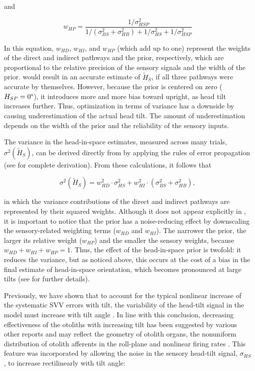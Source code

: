 and

\begin{equation}
\label{p1:eqn9}
w_{HP} = \frac{1 / \sigma^2_{HSP}}{1 / (\sigma^2_{BS} + \sigma^2_{HB}) + 1/\sigma^2_{HS} + 1/\sigma^2_{HSP}}
\end{equation}

In this equation, $w_{HD}$, $w_{HI}$, and $w_{HP}$ (which add up to one) represent the weights of the direct and indirect pathways and the prior, respectively, which are proportional to the relative precision of the sensory signals and the width of the prior.  would result in an accurate estimate of $\tilde{H}_S$, if all three pathways were accurate by themselves. However, because the prior is centered on zero ($H_{SP} = 0\degree$), it introduces more and more bias toward upright, as head tilt increases further. Thus, optimization in terms of variance has a downside by causing underestimation of the actual head tilt. The amount of underestimation depends on the width of the prior and the reliability of the sensory inputs.

The variance in the head-in-space estimates, measured across many trials, $\sigma^2(\tilde{H}_S)$, can be derived directly from  by applying the rules of error propagation (see  for complete derivation). From these calculations, it follows that 

\begin{equation}
\label{p1:eqn10}
\sigma^2(\tilde{H}_{S}) = w^2_{HD} \cdot \sigma^2_{HS} + w^2_{HI} \cdot (\sigma^2_{BS} + \sigma^2_{HB}),
\end{equation}

in which the variance contributions of the direct and indirect pathways are represented by their squared weights. Although it does not appear explicitly in , it is important to notice that the prior has a noise-reducing effect by downscaling the sensory-related weighting terms ($w_{HD}$ and $w_{HI}$). The narrower the prior, the larger its relative weight ($w_{HP}$) and the smaller the sensory weights, because $w_{HD} + w_{HI} + w_{HP} = 1$. Thus, the effect of the head-in-space prior is twofold: it reduces the variance, but as noticed above, this occurs at the cost of a bias in the final estimate of head-in-space orientation, which becomes pronounced at large tilts (see  for further details). 

Previously, we have shown that to account for the typical nonlinear increase of the systematic SVV errors with tilt, the variability of the head-tilt signal in the model must increase with tilt angle \cite{devrijer2008,devrijer2009}. In line with this conclusion, decreasing effectiveness of the otoliths with increasing tilt has been suggested by various other reports \cite{schone1968,tarnutzer2009,tarnutzer2010} and may reflect the geometry of otolith organs, the nonuniform distribution of otolith afferents in the roll-plane and nonlinear firing rates \cite{tarnutzer2010}. This feature was incorporated by allowing the noise in the sensory head-tilt signal, $\sigma_{HS}$, to increase rectilinearly with tilt angle: 


